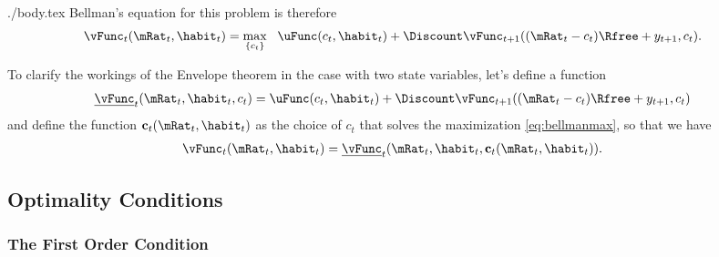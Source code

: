 \documentclass{handout}
\begin{document}
\begin{verbatimwrite}{./body.tex}
Bellman's equation for this problem is therefore
\begin{equation}\begin{gathered}\begin{aligned}
\vFunc_{t}(\mRat_{t},\habit_{t}) & =   \max_{\{c_{t}\}} ~~\uFunc(c_{t},\habit_{t}) 
+  \Discount \vFunc_{t+1}((\mRat_{t}-c_{t})\Rfree+y_{t+1},c_{t}).  \label{eq:bellmanmax}
\end{aligned}\end{gathered}\end{equation}

To clarify the workings of the Envelope theorem in the case with two state
variables, let's define a function 
\begin{equation}\begin{gathered}\begin{aligned}
        \underline{\vFunc}_{t}(\mRat_{t},\habit_{t},c_{t}) & =  \uFunc(c_{t},\habit_{t})
        +\Discount \vFunc_{t+1}((\mRat_{t}-c_{t})\Rfree+y_{t+1},c_{t}) 
\end{aligned}\end{gathered}\end{equation}
and define the function $\mathbf{c}_{t}(\mRat_{t},\habit_{t})$ as the choice of 
$c_{t}$ that solves the maximization \eqref{eq:bellmanmax}, so that
we have
\begin{equation}\begin{gathered}\begin{aligned}
        \vFunc_{t}(\mRat_{t},\habit_{t}) & =  \underline{\vFunc}_{t}(\mRat_{t},\habit_{t},\mathbf{c}_{t}(\mRat_{t},\habit_{t})).
\end{aligned}\end{gathered}\end{equation}

\subsection{Optimality Conditions}

\subsubsection{The First Order Condition}


\end{verbatimwrite}
\end{document}
